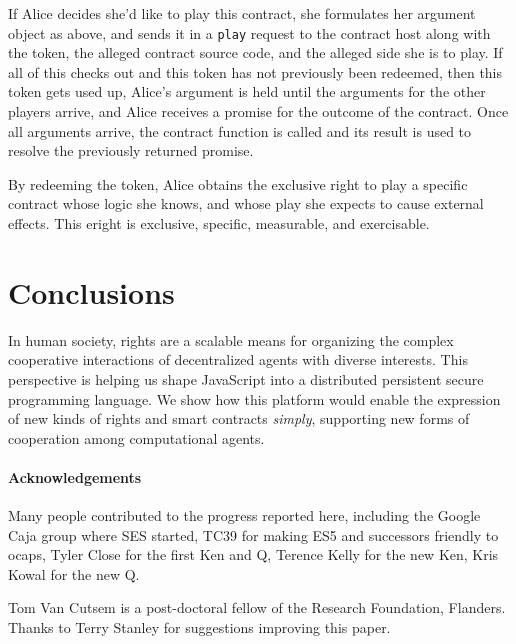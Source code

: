 \documentclass{llncs}
\begin{document}
If Alice decides she'd like to play this contract, she formulates her argument object as above, and sends it in a {\tt play} request to the contract host along with the token, the alleged contract source code, and the alleged side she is to play. If all of this checks out and this token has not previously been redeemed, then this token gets used up, Alice's argument is held until the arguments for the other players arrive, and Alice receives a promise for the outcome of the contract. Once all arguments arrive, the contract function is called and its result is used to resolve the previously returned promise.

By redeeming the token, Alice obtains the exclusive right to play a specific contract whose logic she knows, and whose play she expects to cause external effects. This eright is exclusive, specific, measurable, and exercisable. 

\section*{Conclusions}
\label{conclusions}

In human society, rights are a scalable means for organizing the complex cooperative interactions of decentralized agents with diverse interests. This perspective is helping us shape JavaScript into a distributed persistent secure programming language. We show how this platform would enable the expression of new kinds of rights and smart contracts \emph{simply}, supporting new forms of cooperation among computational agents.



\paragraph{Acknowledgements}

Many people contributed to the progress reported here, including the Google Caja group where SES started, TC39 for making ES5 and successors friendly to ocaps, Tyler Close for the first Ken and Q, Terence Kelly for the new Ken, Kris Kowal for the new Q. 

Tom Van Cutsem is a post-doctoral fellow of the Research Foundation, Flanders. Thanks to Terry Stanley for suggestions improving this paper.


% 

\end{document}
